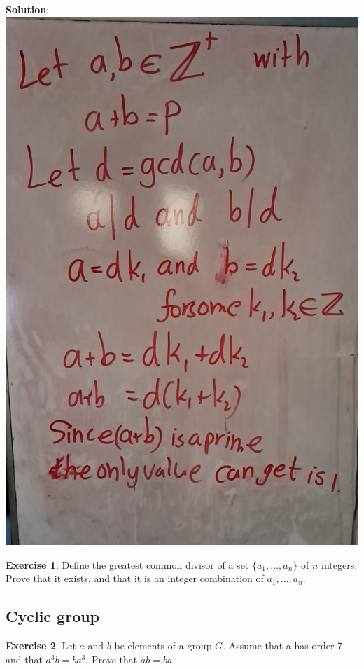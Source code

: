 \documentclass[
]{book}
\theoremstyle{definition}
\theoremstyle{definition}
\theoremstyle{definition}
\newtheorem{exercise}{Exercise}[chapter]
\theoremstyle{definition}
\theoremstyle{remark}
\begin{document}
\textbf{Solution}:
\includegraphics{figures/ch_2/fig21.jpg}

\begin{exercise}
\protect\hypertarget{exr:unnamed-chunk-70}{}\label{exr:unnamed-chunk-70}Define the greatest common divisor of a set \(\{a_1, ..., a_n\}\) of \(n\) integers. Prove that it
exists, and that it is an integer combination of \(a_1, ..., a_n\).
\end{exercise}

\hypertarget{cyclic-group}{%
\subsection{Cyclic group}\label{cyclic-group}}

\begin{exercise}
\protect\hypertarget{exr:unnamed-chunk-71}{}\label{exr:unnamed-chunk-71}Let \(a\) and \(b\) be elements of a group \(G\). Assume that a has order \(7\) and that \(a^3b = ba^3\).
Prove that \(a b = ba\).
\end{exercise}
\end{document}
